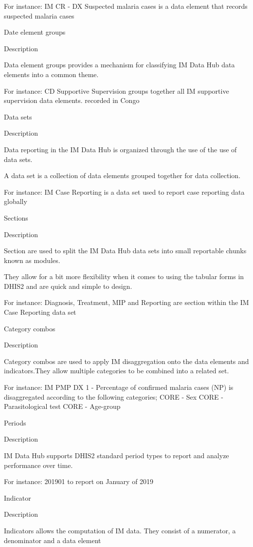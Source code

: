 \documentclass[]{book}
\begin{document}
For instance: IM CR - DX Suspected malaria cases is a data element that records suspected malaria cases

Date element groups

Description

Data element groups provides a mechanism for classifying IM Data Hub data elements into a common theme.

For instance: CD Supportive Supervision groups together all IM supportive supervision data elements. recorded in Congo

Data sets

Description

Data reporting in the IM Data Hub is organized through the use of the use of data sets.

A data set is a collection of data elements grouped together for data collection.

For instance: IM Case Reporting is a data set used to report case reporting data globally

Sections

Description

Section are used to split the IM Data Hub data sets into small reportable chunks known as modules.

They allow for a bit more flexibility when it comes to using the tabular forms in DHIS2 and are quick and simple to design.

For instance: Diagnosis, Treatment, MIP and Reporting are section within the IM Case Reporting data set

Category combos

Description

Category combos are used to apply IM disaggregation onto the data elements and indicators.They allow multiple categories to be combined into a related set.

For instance: IM PMP DX 1 - Percentage of confirmed malaria cases (NP) is disaggregated according to the following categories; CORE - Sex \textbar{} CORE - Parasitological test \textbar{} CORE - Age-group

Periods

Description

IM Data Hub supports DHIS2 standard period types to report and analyze performance over time.

For instance: 201901 to report on January of 2019

Indicator

Description

Indicators allows the computation of IM data. They consist of a numerator, a denominator and a data element
\end{document}
